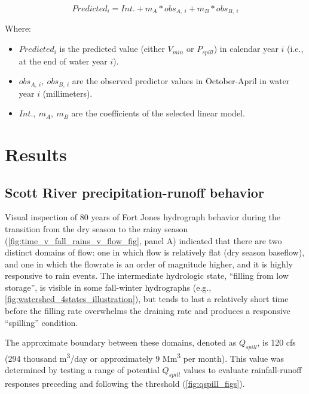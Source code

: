 \documentclass[hess, manuscript]{copernicus}
\providecommand{\tightlist}{%
  \setlength{\itemsep}{0pt}\setlength{\parskip}{0pt}}
\begin{document}
\begin{equation}
Predicted_{i} = Int. + m_A * obs_{A,~i}+m_B*obs_{B,~i}
\end{equation}

Where:

\begin{itemize}
\tightlist
\item
  \(Predicted_i\) is the predicted value (either \(V_{min}\) or
  \(P_{spill}\)) in calendar year \(i\) (i.e., at the end of water year
  \(i\)).
\item
  \(obs_{A,~i},~obs_{B,~i}\) are the observed predictor values in
  October-April in water year \(i\) (millimeters).
\item
  \(Int.,~m_A,~m_B\) are the coefficients of the selected linear model.
\end{itemize}

\section{Results}

\subsection{Scott River precipitation-runoff behavior}

Visual inspection of 80 years of Fort Jones hydrograph behavior during
the transition from the dry season to the rainy season
(\autoref{fig:time_v_fall_rains_v_flow_fig}, panel A) indicated that
there are two distinct domains of flow: one in which flow is relatively
flat (dry season baseflow), and one in which the flowrate is an order of
magnitude higher, and it is highly responsive to rain events. The
intermediate hydrologic state, ``filling from low storage'', is visible
in some fall-winter hydrographs (e.g.,
\autoref{fig:watershed_4states_illustration}), but tends to last a
relatively short time before the filling rate overwhelms the draining
rate and produces a responsive ``spilling'' condition.

The approximate boundary between these domains, denoted as
\(Q_{spill}\), is 120 cfs (294 thousand m\textsuperscript{3}/day or
approximately 9 Mm\textsuperscript{3} per month). This value was
determined by testing a range of potential \(Q_{spill}\) values to
evaluate rainfall-runoff responses preceding and following the threshold
(\autoref{fig:qspill_figs}).
\end{document}
